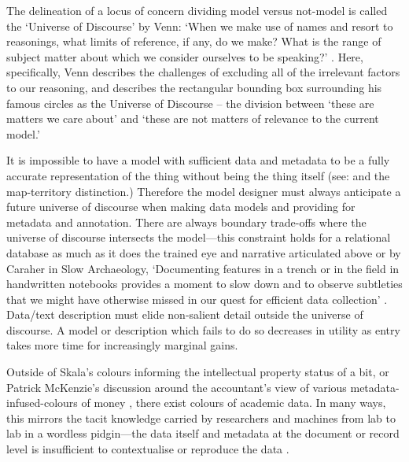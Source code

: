\documentclass{scrarticle}
\begin{document}

The delineation of a locus of concern dividing model versus not-model is called the `Universe of Discourse' by Venn: `When we make use of names and resort to reasonings, what limits of reference, if any, do we make? What is the range of subject matter about which we consider ourselves to be speaking?' \parencite[180]{Venn1881-yy}. Here, specifically, Venn describes the challenges of excluding all of the irrelevant factors to our reasoning, and describes the rectangular bounding box surrounding his famous circles as the Universe of Discourse -- the division between `these are matters we care about' and `these are not matters of relevance to the current model.' 

It is impossible to have a model with sufficient data and metadata to be a fully accurate representation of the thing without being the thing itself (see: \parencite[131]{Borges1975-rn} and the map-territory distinction.) Therefore the model designer must always anticipate a future universe of discourse when making data models and providing for metadata and annotation. There are always boundary trade-offs where the universe of discourse intersects the model---this constraint holds for a relational database as much as it does the trained eye and narrative articulated above or by Caraher in Slow Archaeology, `Documenting features in a trench or in the field in handwritten notebooks provides a moment to slow down and to observe subtleties that we might have otherwise missed in our quest for efficient data collection' \parencite*[50]{Caraher2015-dn}. Data/text description must elide non-salient detail outside the universe of discourse. A model or description which fails to do so decreases in utility as entry takes more time for increasingly marginal gains.


Outside of Skala's colours informing the intellectual property status of a bit, or Patrick McKenzie's discussion around the accountant's view of various metadata-infused-colours of money \parencite*{Mckenzie2022-tt}, there exist colours of academic data. In many ways, this mirrors the tacit knowledge carried by researchers and machines from lab to lab in a wordless pidgin---the data itself and metadata at the document or record level is insufficient to contextualise or reproduce the data \parencite[51]{Galison1997-dz}. 
\end{document}
